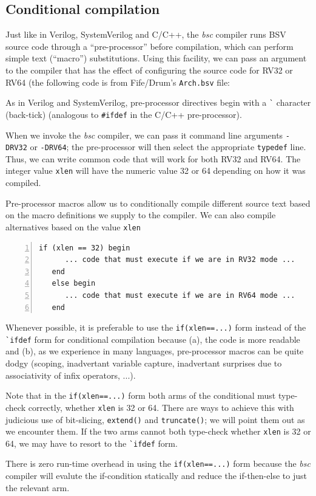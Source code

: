 
\subsection{Conditional compilation}

\label{BSV_Conditional_compilation}


Just like in Verilog, SystemVerilog and C/C++, the \emph{bsc} compiler
runs BSV source code through a ``pre-processor'' before compilation,
which can perform simple text (``macro'') substitutions.  Using this
facility, we can pass an argument to the compiler that has the effect
of configuring the source code for RV32 or RV64 (the following code is
from Fife/Drum's \verb|Arch.bsv| file:



As in Verilog and SystemVerilog, pre-processor directives begin with a
\verb|`| character (back-tick) (analogous to \verb|#ifdef| in the
C/C++ pre-processor).

When we invoke the \emph{bsc} compiler, we can pass it command line
arguments \verb|-DRV32| or \verb|-DRV64|; the pre-processor will then
select the appropriate \verb|typedef| line.  Thus, we can write common
code that will work for both RV32 and RV64.  The integer value
\verb|xlen| will have the numeric value 32 or 64 depending on how it
was compiled.

Pre-processor macros allow us to conditionally compile different
source text based on the macro definitions we supply to the compiler.
We can also compile alternatives based on the value \verb|xlen|

{\small
\begin{Verbatim}[frame=single, numbers=left]
   if (xlen == 32) begin
      ... code that must execute if we are in RV32 mode ...
   end
   else begin
      ... code that must execute if we are in RV64 mode ...
   end
\end{Verbatim}
}

Whenever possible, it is preferable to use the \verb|if(xlen==...)|
form instead of the \verb|`ifdef| form for conditional compilation
because (a), the code is more readable and (b), as we experience in
many languages, pre-processor macros can be quite dodgy (scoping,
inadvertant variable capture, inadvertant surprises due to
associativity of infix operators, ...).

Note that in the \verb|if(xlen==...)| form both arms of the
conditional must type-check correctly, whether \verb|xlen| is 32 or
64.  There are ways to achieve this with judicious use of bit-slicing,
\verb|extend()| and \verb|truncate()|; we will point them out as we
encounter them.  If the two arms cannot both type-check whether
\verb|xlen| is 32 or 64, we may have to resort to the \verb|`ifdef|
form.

There is zero run-time overhead in using the \verb|if(xlen==...)| form
because the \emph{bsc} compiler will evalute the if-condition
statically and reduce the if-then-else to just the relevant arm.

